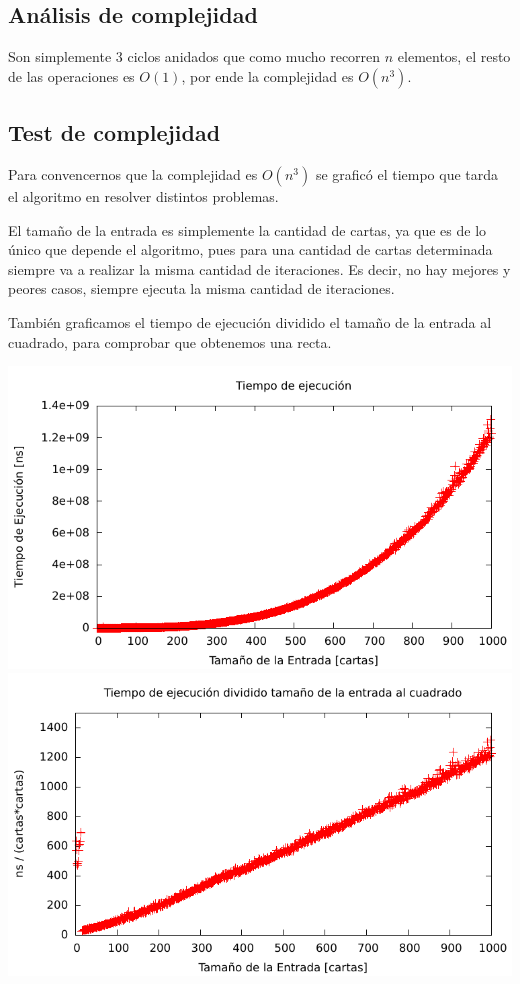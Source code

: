 \subsection{An\'alisis de complejidad}
Son simplemente 3 ciclos anidados que como mucho recorren $n$ elementos, el resto de las operaciones es $O(1)$, por
ende la complejidad es $O(n^3)$.

\subsection{Test de complejidad}
Para convencernos que la complejidad es $O(n^3)$ se graficó el tiempo que tarda el algoritmo en resolver distintos problemas.

El tamaño de la entrada es simplemente la cantidad de cartas, ya que es de lo único que depende el algoritmo, pues para una cantidad de
cartas determinada siempre va a realizar la misma cantidad de iteraciones. Es decir, no hay mejores y peores casos, siempre ejecuta la
misma cantidad de iteraciones.

También graficamos el tiempo de ejecución dividido el tamaño de la entrada al cuadrado, para comprobar que obtenemos una recta.

\includegraphics[width=\textwidth]{ej1/cubico.pdf}
\includegraphics[width=\textwidth]{ej1/lineal.pdf}

